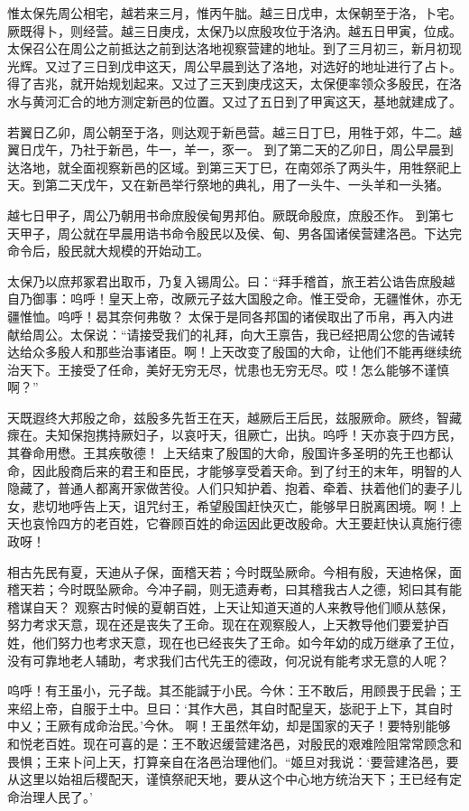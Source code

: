 \documentclass[12pt,UTF8]{ctexbook}
\begin{document}
惟太保先周公相宅，越若来三月，惟丙午朏。越三日戊申，太保朝至于洛，卜宅。厥既得卜，则经营。越三日庚戌，太保乃以庶殷攻位于洛汭。越五日甲寅，位成。
太保召公在周公之前抵达之前到达洛地视察营建的地址。到了三月初三，新月初现光辉。又过了三日到戊申这天，周公早晨到达了洛地，对选好的地址进行了占卜。得了吉兆，就开始规划起来。又过了三天到庚戌这天，太保便率领众多殷民，在洛水与黄河汇合的地方测定新邑的位置。又过了五日到了甲寅这天，基地就建成了。

若翼日乙卯，周公朝至于洛，则达观于新邑营。越三日丁巳，用牲于郊，牛二。越翼日戊午，乃社于新邑，牛一，羊一，豕一。
到了第二天的乙卯日，周公早晨到达洛地，就全面视察新邑的区域。到第三天丁巳，在南郊杀了两头牛，用牲祭祀上天。到第二天戊午，又在新邑举行祭地的典礼，用了一头牛、一头羊和一头猪。

越七日甲子，周公乃朝用书命庶殷侯甸男邦伯。厥既命殷庶，庶殷丕作。
到第七天甲子，周公就在早晨用诰书命令殷民以及侯、甸、男各国诸侯营建洛邑。下达完命令后，殷民就大规模的开始动工。

太保乃以庶邦冢君出取币，乃复入锡周公。曰：“拜手稽首，旅王若公诰告庶殷越自乃御事：呜呼！皇天上帝，改厥元子兹大国殷之命。惟王受命，无疆惟休，亦无疆惟恤。呜呼！曷其奈何弗敬？
太保于是同各邦国的诸侯取出了币帛，再入内进献给周公。太保说：“请接受我们的礼拜，向大王禀告，我已经把周公您的告诫转达给众多殷人和那些治事诸臣。啊！上天改变了殷国的大命，让他们不能再继续统治天下。王接受了任命，美好无穷无尽，忧患也无穷无尽。哎！怎么能够不谨慎啊？”

天既遐终大邦殷之命，兹殷多先哲王在天，越厥后王后民，兹服厥命。厥终，智藏瘝在。夫知保抱携持厥妇子，以哀吁天，徂厥亡，出执。呜呼！天亦哀于四方民，其眷命用懋。王其疾敬德！
上天结束了殷国的大命，殷国许多圣明的先王也都认命，因此殷商后来的君王和臣民，才能够享受着天命。到了纣王的末年，明智的人隐藏了，普通人都离开家做苦役。人们只知护着、抱着、牵着、扶着他们的妻子儿女，悲切地呼告上天，诅咒纣王，希望殷国赶快灭亡，能够早日脱离困境。啊！上天也哀怜四方的老百姓，它眷顾百姓的命运因此更改殷命。大王要赶快认真施行德政呀！

相古先民有夏，天迪从子保，面稽天若；今时既坠厥命。今相有殷，天迪格保，面稽天若；今时既坠厥命。今冲子嗣，则无遗寿耇，曰其稽我古人之德，矧曰其有能稽谋自天？
观察古时候的夏朝百姓，上天让知道天道的人来教导他们顺从慈保，努力考求天意，现在还是丧失了王命。现在在观察殷人，上天教导他们要爱护百姓，他们努力也考求天意，现在也已经丧失了王命。如今年幼的成万继承了王位，没有可靠地老人辅助，考求我们古代先王的德政，何况说有能考求无意的人呢？

呜呼！有王虽小，元子哉。其丕能諴于小民。今休：王不敢后，用顾畏于民碞；王来绍上帝，自服于土中。旦曰：‘其作大邑，其自时配皇天，毖祀于上下，其自时中乂；王厥有成命治民。’今休。
啊！王虽然年幼，却是国家的天子！要特别能够和悦老百姓。现在可喜的是：王不敢迟缓营建洛邑，对殷民的艰难险阻常常顾念和畏惧；王来卜问上天，打算亲自在洛邑治理他们。“姬旦对我说：‘要营建洛邑，要从这里以始祖后稷配天，谨慎祭祀天地，要从这个中心地方统治天下；王已经有定命治理人民了。’
\end{document}
